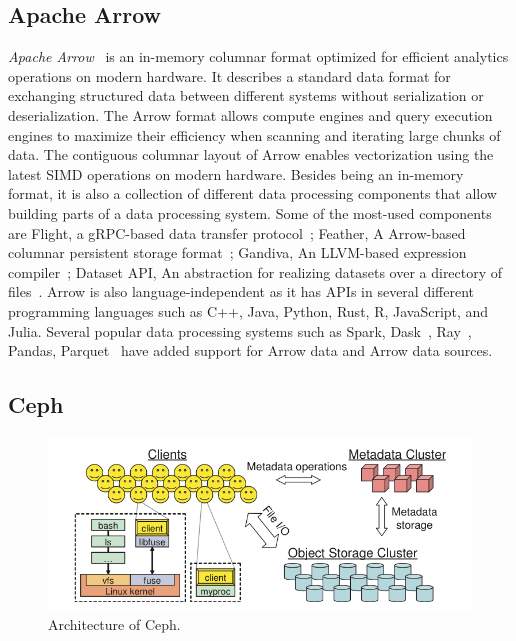 \documentclass[11pt]{article}
\begin{document}
\subsection{Apache Arrow}
\textit{Apache Arrow}~\cite{Arrow} is an in-memory columnar format optimized for efficient analytics operations on modern hardware. It describes a standard data format for exchanging structured data between different systems without serialization or deserialization. The Arrow format allows compute engines and query execution engines to maximize their efficiency when scanning and iterating large chunks of data. The contiguous columnar layout of Arrow enables vectorization using the latest SIMD operations on modern hardware. Besides being an in-memory format, it is also a collection of different data processing components that allow building parts of a data processing system. Some of the most-used components are Flight, a gRPC-based data transfer protocol~\cite{flight}; Feather, A Arrow-based columnar persistent storage format~\cite{feather}; Gandiva, An LLVM-based expression compiler~\cite{gandiva}; Dataset API, An abstraction for realizing datasets over a directory of files~\cite{ArrowDatasetDocs}. Arrow is also language-independent as it has APIs in several different programming languages such as C++, Java, Python, Rust, R, JavaScript, and Julia. Several popular data processing systems such as Spark, Dask~\cite{Dask}, Ray~\cite{Ray}, Pandas, Parquet~\cite{parquet} have added support for Arrow data and Arrow data sources.

\subsection{Ceph}
\begin{figure}[h]
\centering
\includegraphics[width=\textwidth]{figs/cepharch.png}
\caption{Architecture of Ceph.}
\label{fig:ceph-arch}
\end{figure}
\end{document}
